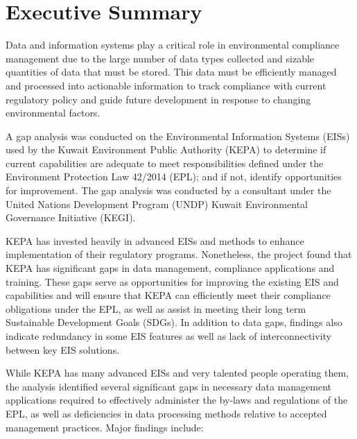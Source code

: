 \chapter*{Executive Summary}

Data and information systems play a critical role in environmental compliance management due to the large number of data types collected and sizable quantities of data that must be stored.  This data must be efficiently managed and processed into actionable information to track compliance with current regulatory policy and guide future development in response to changing environmental factors.

A gap analysis was conducted on the Environmental Information Systems (EISs) used by the Kuwait Environment Public Authority (KEPA) to determine if current capabilities are adequate to meet responsibilities defined under the Environment Protection Law 42/2014 (EPL); and if not, identify opportunities for improvement.  The gap analysis was conducted by a consultant under the United Nations Development Program (UNDP) Kuwait Environmental Governance Initiative (KEGI).

KEPA has invested heavily in advanced EISs and methods to enhance implementation of their regulatory programs. Nonetheless, the project found that KEPA has significant gaps in data management, compliance applications and training.  These gaps serve as opportunities for improving the existing EIS and capabilities and will ensure that KEPA can efficiently meet their compliance obligations under the EPL, as well as assist in meeting their long term Sustainable Development Goals (SDGs).  In addition to data gaps, findings also indicate redundancy in some EIS features as well as lack of interconnectivity between key EIS solutions.

While KEPA has many advanced EISs and very talented people operating them, the analysis identified several significant gaps in necessary data management applications required to effectively administer the by-laws and regulations of the EPL, as well as deficiencies in data processing methods relative to accepted management practices. Major findings include:

